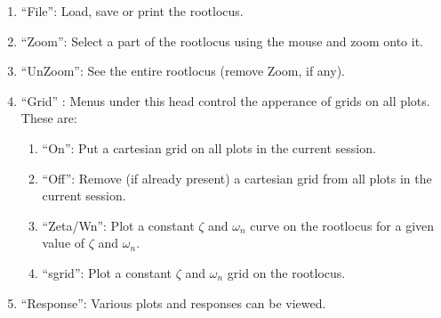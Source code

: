 \begin{enumerate}
\item ``File'': Load, save or print the rootlocus.
\item ``Zoom'': Select a part of the rootlocus using the mouse and
  zoom onto it.
\item ``UnZoom'': See the entire rootlocus (remove Zoom, if any).
\item ``Grid'' : Menus under this head control the apperance of grids
  on all plots. These are:
  \begin{enumerate}
    \item ``On'': Put a cartesian grid on all plots in the current
    session.
    \item ``Off'': Remove (if already present) a cartesian grid from
    all plots in the  current session.
    \item ``Zeta/Wn'': Plot a constant $\zeta$ and $\omega_n$ curve on
    the rootlocus for a given value of $\zeta$ and $\omega_n$.
    \item ``sgrid'': Plot a constant $\zeta$ and $\omega_n$ grid on
    the rootlocus.
  \end{enumerate} 
\item ``Response'': Various plots and responses can be viewed. 
 

\end{enumerate}

